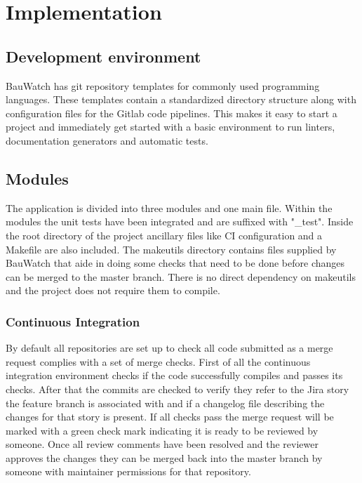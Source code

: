 \chapter{Implementation}
\section{Development environment}
BauWatch has git repository templates for commonly used programming languages.
These templates contain a standardized directory structure along with configuration files for the Gitlab code pipelines.
This makes it easy to start a project and immediately get started with a basic environment to run linters, documentation generators and automatic tests.

\section{Modules}
The application is divided into three modules and one main file.
Within the modules the unit tests have been integrated and are suffixed with "\_test".
Inside the root directory of the project ancillary files like CI configuration and a Makefile are also included.
The makeutils directory contains files supplied by BauWatch that aide in doing some checks that need to be done before changes can be merged to the master branch.
There is no direct dependency on makeutils and the project does not require them to compile.

\subsection{Continuous Integration}
By default all repositories are set up to check all code submitted as a merge request complies with a set of merge checks.
First of all the continuous integration environment checks if the code successfully compiles and passes its checks.
After that the commits are checked to verify they refer to the Jira story the feature branch is associated with and if a changelog file describing the changes for that story is present.
If all checks pass the merge request will be marked with a green check mark indicating it is ready to be reviewed by someone.
Once all review comments have been resolved and the reviewer approves the changes they can be merged back into the master branch by someone with maintainer permissions for that repository.



